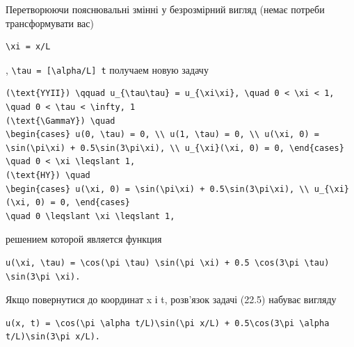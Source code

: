 \documentclass[
  ukrainian,
]{article}
\begin{document}
Перетворюючи пояснювальні змінні у безрозмірний вигляд (немає потреби
трансформувати вас)

\begin{verbatim}
\xi = x/L
\end{verbatim}

, \texttt{\textbackslash{}tau\ =\ {[}\textbackslash{}alpha/L{]}\ t}
получаем новую задачу

\begin{verbatim}
(\text{YYII}) \qquad u_{\tau\tau} = u_{\xi\xi}, \quad 0 < \xi < 1, \quad 0 < \tau < \infty, 1
(\text{\GammaY}) \quad
\begin{cases} u(0, \tau) = 0, \\ u(1, \tau) = 0, \\ u(\xi, 0) = \sin(\pi\xi) + 0.5\sin(3\pi\xi), \\ u_{\xi}(\xi, 0) = 0, \end{cases}
\quad 0 < \xi \leqslant 1,
(\text{HY}) \quad
\begin{cases} u(\xi, 0) = \sin(\pi\xi) + 0.5\sin(3\pi\xi), \\ u_{\xi}(\xi, 0) = 0, \end{cases}
\quad 0 \leqslant \xi \leqslant 1,
\end{verbatim}

решением которой является функция

\begin{verbatim}
u(\xi, \tau) = \cos(\pi \tau) \sin(\pi \xi) + 0.5 \cos(3\pi \tau) \sin(3\pi \xi).
\end{verbatim}

Якщо повернутися до координат x і t, розв'язок задачі (22.5) набуває
вигляду

\begin{verbatim}
u(x, t) = \cos(\pi \alpha t/L)\sin(\pi x/L) + 0.5\cos(3\pi \alpha t/L)\sin(3\pi x/L).
\end{verbatim}
\end{document}
